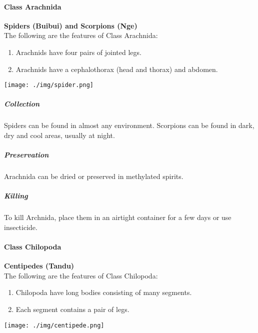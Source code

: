 \begin{multicols}{2}
\paragraph{Class Arachnida}
\textbf{Spiders (Buibui) and Scorpions (Nge)}\\
The following are the features of Class Arachnida:
\begin{enumerate}
\item{Arachnids have four pairs of jointed legs.}
\item{Arachnids have a cephalothorax (head and thorax) and abdomen.}
\end{enumerate}

\begin{center}
\texttt{[image: ./img/spider.png]}
\end{center}

%

\subparagraph{Collection}
Spiders can be found in almost any environment. Scorpions can be found in dark, dry and cool areas, usually at night.

\subparagraph{Preservation} 
Arachnida can be dried or preserved in methylated spirits.

\subparagraph{Killing}
To kill Archnida, place them in an airtight container for a few days or use insecticide.
		
\paragraph{Class Chilopoda}
\textbf{Centipedes (Tandu)}\\
The following are the features of Class Chilopoda:
\begin{enumerate}
\item{Chilopoda have long bodies consisting of many segments.}
\item{Each segment contains a pair of legs.}
\end{enumerate}

\begin{center}
\texttt{[image: ./img/centipede.png]}
\end{center}


\end{multicols}
